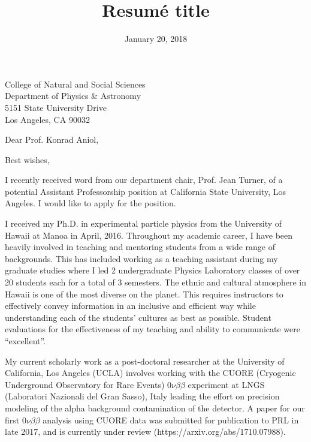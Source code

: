 \documentclass[11pt,a4paper,sans]{moderncv}        %
\title{Resumé title}                               %
\begin{document}
{College of Natural and Social Sciences\\
Department of Physics \& Astronomy\\
5151 State University Drive\\
Los Angeles, CA 90032}
\date{January 20, 2018}
\opening{Dear Prof. Konrad Aniol,}
\closing{Best wishes,}
\makelettertitle

I recently received word from our department chair, Prof. Jean Turner, of a potential Assistant Professorship position at California State University, Los Angeles. I would like to apply for the position.

I received my Ph.D. in experimental particle physics from the University of
Hawaii at Manoa in April, 2016. Throughout my academic career, I have been
heavily involved in teaching and mentoring students from a wide range of
backgrounds. This has included working as a teaching assistant during my
graduate studies where I led 2 undergraduate Physics Laboratory classes of over
20 students each for a total of 3 semesters. The ethnic and cultural atmosphere
in Hawaii is one of the most diverse on the planet. This requires instructors
to effectively convey information in an inclusive and efficient way while
understanding each of the students' cultures as best as possible. Student
evaluations for the effectiveness of my teaching and ability to communicate
were ``excellent''.

My current scholarly work as a post-doctoral researcher at the University of
California, Los Angeles (UCLA) involves working with the CUORE (Cryogenic
Underground Observatory for Rare Events) $0\nu\beta\beta$ experiment at LNGS
(Laboratori Nazionali del Gran Sasso), Italy leading the effort on precision
modeling of the alpha background contamination of the detector. A paper for our
first $0\nu\beta\beta$ analysis using CUORE data was submitted for publication
to PRL in late 2017, and is currently under review
(https://arxiv.org/abs/1710.07988).
\end{document}

